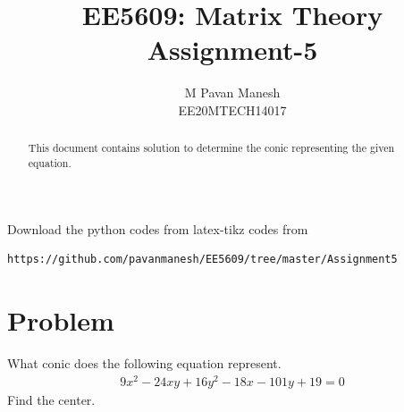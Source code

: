 \documentclass[journal,12pt,twocolumn]{IEEEtran}
\begin{document}
\makeatletter
{}
\makeatother
\let\StandardTheFigure\thefigure
\let\vec\mathbf
\renewcommand{\thefigure}{\theproblem}
\def\putbox#1#2#3{\makebox[0in][l]{\makebox[#1][l]{}\raisebox{\baselineskip}[0in][0in]{\raisebox{#2}[0in][0in]{#3}}}}
     \def\rightbox#1{\makebox[0in][r]{#1}}
     \def\centbox#1{\makebox[0in]{#1}}
     \def\topbox#1{\raisebox{-\baselineskip}[0in][0in]{#1}}
     \def\midbox#1{\raisebox{-0.5\baselineskip}[0in][0in]{#1}}
\vspace{3cm}
\title{EE5609: Matrix Theory\\
          Assignment-5\\}
\author{M Pavan Manesh\\
EE20MTECH14017 }
\maketitle
\newpage
\bigskip
\renewcommand{\thefigure}{\theenumi}
\renewcommand{\thetable}{\theenumi}
\begin{abstract}
This document contains solution to determine the conic representing the given equation. 
\end{abstract}
Download the python codes from 
%
%
latex-tikz codes from 
%
\begin{lstlisting}
https://github.com/pavanmanesh/EE5609/tree/master/Assignment5
\end{lstlisting}
%
\section{Problem}
What conic does the following equation represent. 
\begin{align*}
9x^2-24xy+16y^2-18x-101y+19 = 0
\end{align*}
Find the center.
\end{document}

